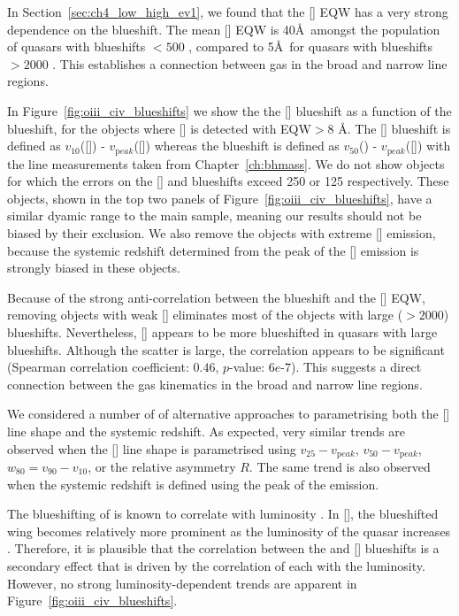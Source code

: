In Section~\ref{sec:ch4_low_high_ev1}, we found that the [] EQW has a very strong dependence on the  blueshift.
The mean [] EQW is 40\AA\, amongst the population of quasars with  blueshifts $<500$ \kms, compared to 5\AA\, for quasars with  blueshifts $>2000$ \kms. 
This establishes a connection between gas in the broad and narrow line regions. 

In Figure~\ref{fig:oiii_civ_blueshifts} we show the the [] blueshift as a function of the  blueshift, for the objects where [] is detected with EQW$>8$ \AA. 
The [] blueshift is defined as $v_{10}$([]) - $v_{\mathrm peak}$([]) whereas the  blueshift is defined as $v_{50}$() - $v_{\mathrm peak}$([]) with the  line measurements taken from Chapter~\ref{ch:bhmass}.
We do not show objects for which the errors on the [] and  blueshifts exceed 250 or 125 \kms respectively. 
These objects, shown in the top two panels of Figure~\ref{fig:oiii_civ_blueshifts}, have a similar dyamic range to the main sample, meaning our results should not be biased by their exclusion.  
We also remove the objects with extreme [] emission, because the systemic redshift determined from the peak of the [] emission is strongly biased in these objects. 

Because of the strong anti-correlation between the  blueshift and the [] EQW, removing objects with weak [] eliminates most of the objects with large ($>2000$\kms)  blueshifts.  
Nevertheless, [] appears to be more blueshifted in quasars with large  blueshifts.
Although the scatter is large, the correlation appears to be significant (Spearman correlation coefficient: $0.46$, $p$-value: $6e\text{-}7$). 
This suggests a direct connection between the gas kinematics in the broad and narrow line regions. 

We considered a number of of alternative approaches to parametrising both the [] line shape and the systemic redshift. 
As expected, very similar trends are observed when the [] line shape is parametrised using $v_{25} - v_{\mathrm peak}$, $v_{50} - v_{\mathrm peak}$, $w_{80} = v_{90} - v_{10}$, or the relative asymmetry $R$.
The same trend is also observed when the systemic redshift is defined using the peak of the \hb emission. 

The blueshifting of  is known to correlate with luminosity \citep{richards11}.
In [], the blueshifted wing becomes relatively more prominent as the luminosity of the quasar increases \citep{shen14}. 
Therefore, it is plausible that the correlation between the  and [] blueshifts is a secondary effect that is driven by the correlation of each with the luminosity. 
However, no strong luminosity-dependent trends are apparent in Figure~\ref{fig:oiii_civ_blueshifts}. 

